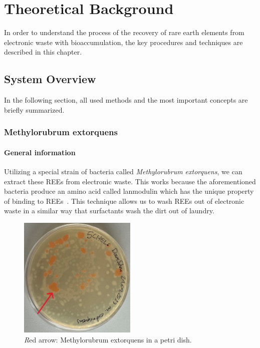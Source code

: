 \chapter{Theoretical Background}
In order to understand the process of the recovery of rare earth elements from electronic waste with bioaccumulation, the key procedures and techniques are described in this chapter.


\section{System Overview}
In the following section, all used methods and the most important concepts are briefly summarized.


\subsection{Methylorubrum extorquens}

\subsubsection{General information\authorB{}}

Utilizing a special strain of bacteria called \emph{Methylorubrum extorquens}, we can extract these REEs from electronic waste.
This works because the aforementioned bacteria produce an amino acid called lanmodulin which has the unique property of binding to REEs~\cite{lanmdiscovery}.
This technique allows us to wash REEs out of electronic waste in a similar way that
surfactants wash the dirt out of laundry.

\begin{figure}[H]
    \centering
    \includegraphics[width=0.5\textwidth]{./media/images/mextorquens_petri_dish}
    \caption{\emph Red arrow: {Methylorubrum extorquens} in a petri dish.}
    \label{fig:mextorquens_petri_dish}
\end{figure}

